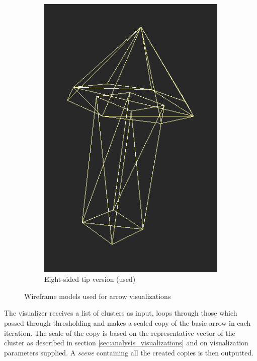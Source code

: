 \begin{figure}[h]
\begin{subfigure}{0.3\textwidth}
	\includegraphics[width=\textwidth]{./img/8sided_arrow.PNG}
    \caption{Eight-sided tip version (used)}
    \label{fig:8sided_arrow}
	\end{subfigure}
\caption[Wireframe models used for arrow visualizations]{Wireframe models used for arrow visualizations}
\end{figure}

The visualizer receives a list of clusters as input, loops through those which passed through thresholding and makes a scaled copy of the basic arrow in each iteration. The scale of the copy is based on the representative vector of the cluster as described in section \ref{sec:analysis_visualizations} and on visualization parameters supplied. A {\it scene} containing all the created copies is then outputted.

